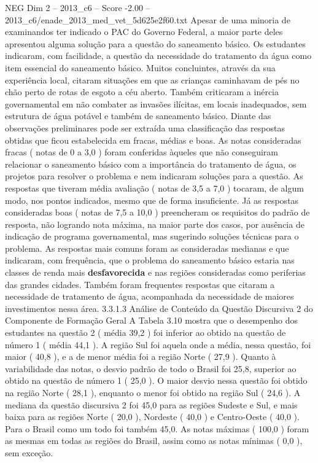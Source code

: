 \begin{textsample}{NEG Dim 2 – 2013\_c6 – Score -2.00 – 2013\_c6/enade\_2013\_med\_vet\_5d625e2f60.txt}
Apesar de uma minoria de examinandos ter indicado o PAC do Governo Federal, a maior parte deles apresentou alguma solução para a questão do saneamento básico.
Os estudantes indicaram, com facilidade, a questão da necessidade do tratamento da água como item essencial do saneamento básico.
Muitos concluintes, através da sua experiência local, citaram situações em que as crianças caminhavam de pés no chão perto de rotas de esgoto a céu aberto.
Também criticaram a inércia governamental em não combater as invasões ilícitas, em locais inadequados, sem estrutura de água potável e também de saneamento básico.
Diante das observações preliminares pode ser extraída uma classificação das respostas obtidas que ficou estabelecida em fracas, médias e boas.
As notas consideradas fracas ( notas de 0 a 3,0 ) foram conferidas àqueles que não conseguiram relacionar o saneamento básico com a importância do tratamento de água, os projetos para resolver o problema e nem indicaram soluções para a questão.
As respostas que tiveram média avaliação ( notas de 3,5 a 7,0 ) tocaram, de algum modo, nos pontos indicados, mesmo que de forma insuficiente.
Já as respostas consideradas boas ( notas de 7,5 a 10,0 ) preencheram os requisitos do padrão de resposta, não logrando nota máxima, na maior parte dos casos, por ausência de indicação de programa governamental, mas sugerindo soluções técnicas para o problema.
As respostas mais comuns foram as consideradas medianas e que indicaram, com frequência, que o problema do saneamento básico estaria nas classes de renda mais \textbf{desfavorecida} e nas regiões consideradas como periferias das grandes cidades.
Também foram frequentes respostas que citaram a necessidade de tratamento de água, acompanhada da necessidade de maiores investimentos nessa área. 3.3.1.3 Análise de Conteúdo da Questão Discursiva 2 do Componente de Formação Geral A Tabela 3.10 mostra que o desempenho dos estudantes na questão 2 ( média 39,2 ) foi inferior ao obtido na questão de número 1 ( média 44,1 ).
A região Sul foi aquela onde a média, nessa questão, foi maior ( 40,8 ), e a de menor média foi a região Norte ( 27,9 ).
Quanto à variabilidade das notas, o desvio padrão de todo o Brasil foi 25,8, superior ao obtido na questão de número 1 ( 25,0 ).
O maior desvio nessa questão foi obtido na região Norte ( 28,1 ), enquanto o menor foi obtido na região Sul ( 24,6 ).
A mediana da questão discursiva 2 foi 45,0 para as regiões Sudeste e Sul, e mais baixa para as regiões Norte ( 20,0 ), Nordeste ( 40,0 ) e Centro-Oeste ( 40,0 ).
Para o Brasil como um todo foi também 45,0.
As notas máximas ( 100,0 ) foram as mesmas em todas as regiões do Brasil, assim como as notas mínimas ( 0,0 ), sem exceção.

\end{textsample}
